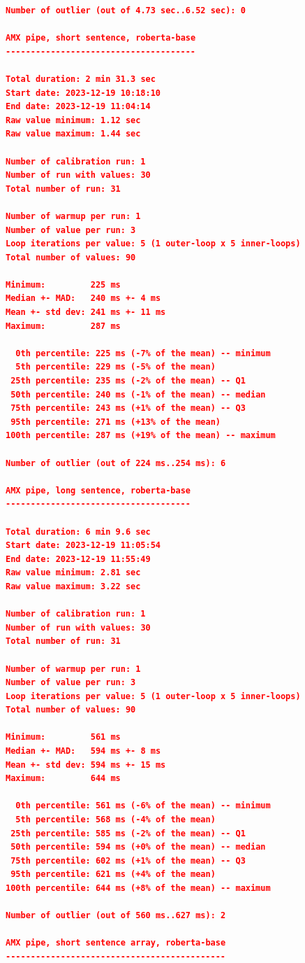 \begin{lstlisting}[language=json]
Number of outlier (out of 4.73 sec..6.52 sec): 0

AMX pipe, short sentence, roberta-base
--------------------------------------

Total duration: 2 min 31.3 sec
Start date: 2023-12-19 10:18:10
End date: 2023-12-19 11:04:14
Raw value minimum: 1.12 sec
Raw value maximum: 1.44 sec

Number of calibration run: 1
Number of run with values: 30
Total number of run: 31

Number of warmup per run: 1
Number of value per run: 3
Loop iterations per value: 5 (1 outer-loop x 5 inner-loops)
Total number of values: 90

Minimum:         225 ms
Median +- MAD:   240 ms +- 4 ms
Mean +- std dev: 241 ms +- 11 ms
Maximum:         287 ms

  0th percentile: 225 ms (-7% of the mean) -- minimum
  5th percentile: 229 ms (-5% of the mean)
 25th percentile: 235 ms (-2% of the mean) -- Q1
 50th percentile: 240 ms (-1% of the mean) -- median
 75th percentile: 243 ms (+1% of the mean) -- Q3
 95th percentile: 271 ms (+13% of the mean)
100th percentile: 287 ms (+19% of the mean) -- maximum

Number of outlier (out of 224 ms..254 ms): 6

AMX pipe, long sentence, roberta-base
-------------------------------------

Total duration: 6 min 9.6 sec
Start date: 2023-12-19 11:05:54
End date: 2023-12-19 11:55:49
Raw value minimum: 2.81 sec
Raw value maximum: 3.22 sec

Number of calibration run: 1
Number of run with values: 30
Total number of run: 31

Number of warmup per run: 1
Number of value per run: 3
Loop iterations per value: 5 (1 outer-loop x 5 inner-loops)
Total number of values: 90

Minimum:         561 ms
Median +- MAD:   594 ms +- 8 ms
Mean +- std dev: 594 ms +- 15 ms
Maximum:         644 ms

  0th percentile: 561 ms (-6% of the mean) -- minimum
  5th percentile: 568 ms (-4% of the mean)
 25th percentile: 585 ms (-2% of the mean) -- Q1
 50th percentile: 594 ms (+0% of the mean) -- median
 75th percentile: 602 ms (+1% of the mean) -- Q3
 95th percentile: 621 ms (+4% of the mean)
100th percentile: 644 ms (+8% of the mean) -- maximum

Number of outlier (out of 560 ms..627 ms): 2

AMX pipe, short sentence array, roberta-base
--------------------------------------------


\end{lstlisting}
